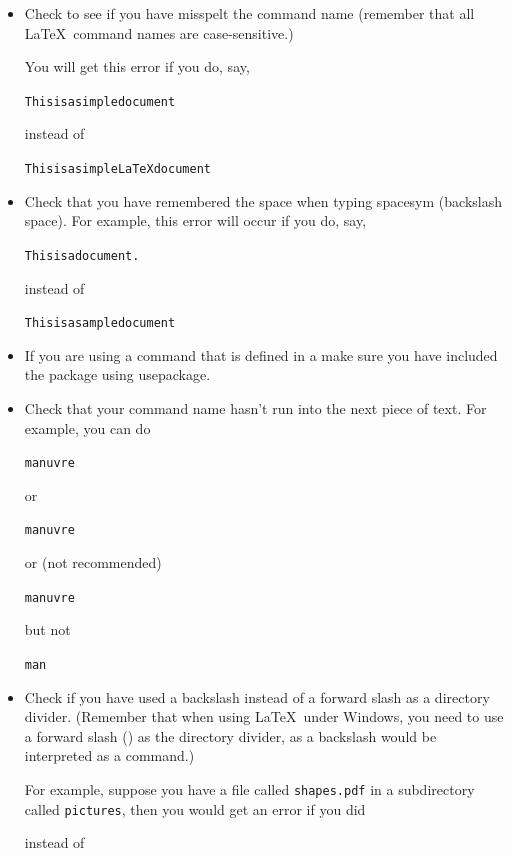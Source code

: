\begin{itemize}
\item Check to see if you have misspelt the command name (remember
that all \LaTeX\ command names are case-sensitive.)

You will get this error if you do, say,
\begin{alltt}\wrong
This is a simple document
\end{alltt}
instead of
\begin{alltt}\correct
This is a simple \gls{LaTeX}document
\end{alltt}

\item Check that you have remembered the space when typing
\gls{spacesym} (backslash space).
For example, this error will occur if you do, say,
\begin{alltt}\wrong
This is a  document.
\end{alltt}
instead of
\begin{alltt}\correct
This is a sample document
\end{alltt}

\item If you are using a command that is defined in a
 make sure you have included the
package using \gls{usepackage}.

\item Check that your command name hasn't run into the next piece
of text.  For example,
you can do
\begin{alltt}
man\marg{}uvre
\end{alltt}
or
\begin{alltt}
man uvre
\end{alltt}
or (not recommended)
\begin{alltt}
manuvre
\end{alltt}
but not
\begin{alltt}\wrong
man
\end{alltt}

\item Check if you have used a backslash instead of a forward slash as a
directory divider.  (Remember that when using \LaTeX\ under Windows,
you need to use a forward slash () as the directory divider, as a
backslash would be interpreted as a command.)

For example, suppose you have a file called \texttt{shapes.pdf} in a 
subdirectory called \texttt{pictures}, then you would get an error 
if you did
\begin{alltt}\wrong
{}
\end{alltt}
instead of
\begin{alltt}\correct
{}
\end{alltt}

\end{itemize}

